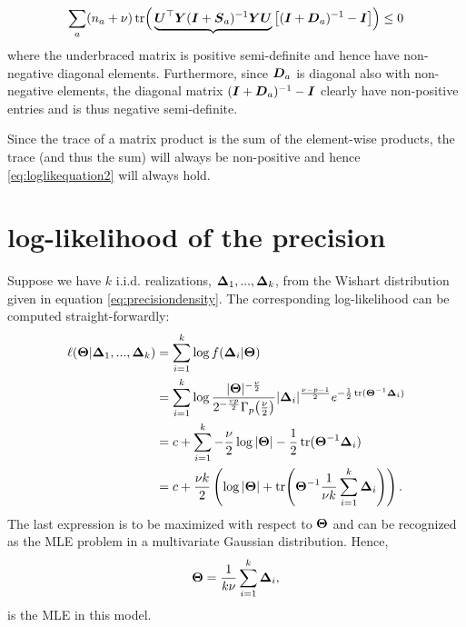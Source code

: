 \documentclass{article}\usepackage[]{graphicx}\usepackage[]{color}
\begin{document}
\begin{align}
  \sum_a (n_a + \nu)\operatorname*{tr}\!\Big(
    \underbrace{{\boldsymbol{U}}^\top {\boldsymbol{Y}} ({\boldsymbol{I}} + {\boldsymbol{S}}_a)^{-1} {\boldsymbol{Y}} {\boldsymbol{U}}}
    \big[ ({\boldsymbol{I}} + {\boldsymbol{D}}_a)^{-1}  - {\boldsymbol{I}} \big]
  \Big)
  \leq 0
  \label{eq:loglikequation2}
\end{align}
where the underbraced matrix is positive semi-definite and hence have non-negative diagonal elements.
Furthermore, since ${\boldsymbol{D}}_a$ is diagonal also with non-negative elements, the diagonal matrix $({\boldsymbol{I}} + {\boldsymbol{D}}_a)^{-1}  - {\boldsymbol{I}}$ clearly have non-positive entries and is thus negative semi-definite.

Since the trace of a matrix product is the sum of the element-wise products, the trace (and thus the sum) will always be non-positive and hence \eqref{eq:loglikequation2} will always hold.

\section{log-likelihood of the precision}
\label{sec:precisionloglik}
Suppose we have $k$ i.i.d. realizations, ${\boldsymbol{\Delta}}_1, ..., {\boldsymbol{\Delta}}_k$, from the Wishart distribution given in equation \eqref{eq:precisiondensity}. The corresponding log-likelihood can be computed straight-forwardly:
\begin{align*}
  \ell({\boldsymbol{\Theta}} | {\boldsymbol{\Delta}}_1, ..., {\boldsymbol{\Delta}}_k)
  &= \sum_{i = 1}^k \log f({\boldsymbol{\Delta}}_i | {\boldsymbol{\Theta}}) \\
  &= \sum_{i = 1}^k \log
    \frac{|{\boldsymbol{\Theta}}|^{-\frac{\nu}{2}}}{
      2^{-\frac{vp}{2}}
      \Gamma_p\!\left(\frac{\nu}{2}\right)}
    |{\boldsymbol{\Delta}}_i|^\frac{\nu - p - 1}{2}e^{-\frac{1}{2}\operatorname*{tr}({\boldsymbol{\Theta}}^{-1}{\boldsymbol{\Delta}}_i)}\\
   &= c + \sum_{i = 1}^k
     -\frac{\nu}{2} \log |{\boldsymbol{\Theta}}|
     -\frac{1}{2}\operatorname*{tr}({\boldsymbol{\Theta}}^{-1}{\boldsymbol{\Delta}}_i) \\
   &= c + \frac{\nu k}{2}
     \left(
       \log |{\boldsymbol{\Theta}}| +
       \operatorname*{tr}\!\left({\boldsymbol{\Theta}}^{-1} \frac{1}{\nu k}\sum_{i = 1}^k{\boldsymbol{\Delta}}_i\right)
     \right).
\end{align*}
The last expression is to be maximized with respect to ${\boldsymbol{\Theta}}$ and can be recognized as the MLE problem in a multivariate Gaussian distribution. Hence,
\begin{align*}
  {\boldsymbol{\Theta}} = \frac{1}{k \nu} \sum_{i = 1}^k {\boldsymbol{\Delta}}_i,
\end{align*}
is the MLE in this model.
\end{document}

